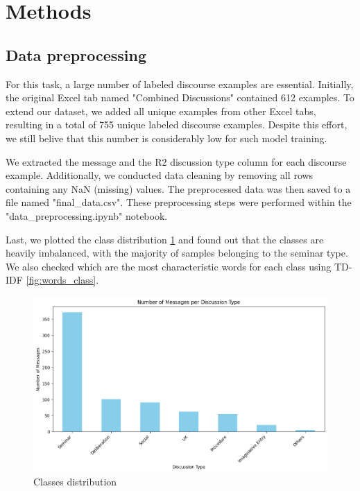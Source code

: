 \documentclass[fleqn,moreauthors,10pt]{ds_report}
\begin{document}
\section*{Methods}




\subsection*{Data preprocessing}

For this task, a large number of labeled discourse examples are essential. Initially, the original Excel tab named "Combined Discussions" contained 612 examples. To extend our dataset, we added all unique examples from other Excel tabs, resulting in a total of 755 unique labeled discourse examples. Despite this effort, we still belive that this number is considerably low for such model training. 

We extracted the message and the R2 discussion type column for each discourse example. Additionally, we conducted data cleaning by removing all rows containing any NaN (missing) values. The preprocessed data was then saved to a file named "final\_data.csv". These preprocessing steps were performed within the "data\_preprocessing.ipynb" notebook.

Last, we plotted the class distribution \ref{fig:classes_distribution} and found out that the classes are heavily imbalanced, with the majority of samples belonging to the seminar type. We also checked which are the most characteristic words for each class using TD-IDF \ref{fig:words_class}.

\begin{figure}[ht]\centering
	\includegraphics[width=\linewidth]{report/fig/classes distribution.png}
        \caption{Classes distribution}
        \label{fig:classes_distribution}
\end{figure}
\end{document}
